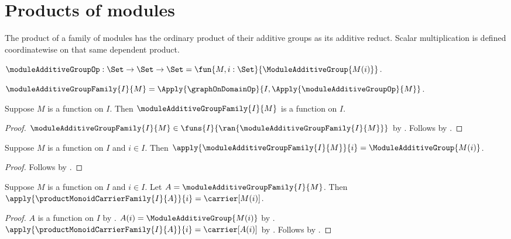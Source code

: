 



\section{Products of modules}

The product of a family of modules has the ordinary product of their
additive groups as its additive reduct.  Scalar multiplication is defined
coordinatewise on that same dependent product.

\begin{definition}\label{module_additive_group_op}
    $\moduleAdditiveGroupOp:\Set\to\Set\to\Set
        =\fun{M,i:\Set}{\ModuleAdditiveGroup{M(i)}}$.
\end{definition}

\begin{definition}\label{module_additive_group_family}
    $\moduleAdditiveGroupFamily{I}{M}
        =\Apply{\graphOnDomainOp}{
            I,\Apply{\moduleAdditiveGroupOp}{M}}$.
\end{definition}

\begin{proposition}\label{module_additive_group_family_type}
    Suppose $M$ is a function on $I$.
    Then $\moduleAdditiveGroupFamily{I}{M}$ is a function on $I$.
\end{proposition}
\begin{proof}
    $\moduleAdditiveGroupFamily{I}{M}\in
        \funs{I}{\ran{\moduleAdditiveGroupFamily{I}{M}}}$ by
        .
    Follows by .
\end{proof}

\begin{proposition}\label{module_additive_group_family_apply}
    Suppose $M$ is a function on $I$ and $i\in I$.
    Then
        $\apply{\moduleAdditiveGroupFamily{I}{M}}{i}
            =\ModuleAdditiveGroup{M(i)}$.
\end{proposition}
\begin{proof}
    Follows by
        .
\end{proof}

\begin{proposition}\label{module_product_carrier_coordinate}
    Suppose $M$ is a function on $I$ and $i\in I$.
    Let $A=\moduleAdditiveGroupFamily{I}{M}$.
    Then
        $\apply{\productMonoidCarrierFamily{I}{A}}{i}
            =\carrier[M(i)]$.
\end{proposition}
\begin{proof}
    $A$ is a function on $I$ by
        .
    $A(i)=\ModuleAdditiveGroup{M(i)}$ by
        .
    $\apply{\productMonoidCarrierFamily{I}{A}}{i}=\carrier[A(i)]$ by
        .
    Follows by .
\end{proof}

